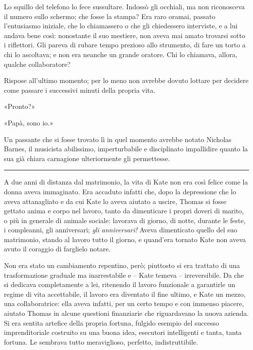 Lo squillo del telefono lo fece sussultare. Indossò gli occhiali, ma non riconosceva il numero sullo
schermo; che fosse la stampa? Era raro oramai, passato l'entusiasmo iniziale, che lo chiamassero o
che gli chiedessero interviste, e a lui andava bene così: nonostante il suo mestiere, non aveva mai
amato trovarsi sotto i riflettori. Gli pareva di rubare tempo prezioso allo strumento, di fare un
torto a chi lo ascoltava; e non era neanche un grande oratore. Chi lo chiamava, allora, qualche
collaboratore?

Rispose all'ultimo momento; per lo meno non avrebbe dovuto lottare per decidere come passare i
successivi minuti della propria vita.

«Pronto?»

«Papà, sono io.»

Un passante che si fosse trovato lì in quel momento avrebbe notato Nicholas Barnes, il musicista
abilissimo, imperturbabile e disciplinato impallidire quanto la sua già chiara carnagione
ulteriormente gli permettesse.

\plainbreak{1}

A due anni di distanza dal matrimonio, la vita di Kate non era così felice come la donna aveva
immaginato. Era accaduto infatti che, dopo la depressione che lo aveva attanagliato e da cui Kate lo
aveva aiutato a uscire, Thomas si fosse gettato anima e corpo nel lavoro, tanto da dimenticare i
propri doveri di marito, o più in generale di animale sociale: lavorava di giorno, di notte, durante
le feste, i compleanni, gli anniversari; \emph{gli anniversari!} Aveva dimenticato quello del suo
matrimonio, stando al lavoro tutto il giorno, e quand'era tornato Kate non aveva avuto il coraggio
di farglielo notare.

Non era stato un cambiamento repentino, però; piuttosto si era trattato di una trasformazione
graduale ma inarrestabile e -- Kate temeva -- irreversibile. Da che si dedicava completamente a lei,
ritenendo il lavoro funzionale a garantirle un regime di vita accettabile, il lavoro era diventato
il fine ultimo, e Kate un mezzo, una collaboratrice: ella aveva infatti, per un certo tempo e con
immenso piacere, aiutato Thomas in alcune questioni finanziarie che riguardavano la nuova azienda.
Si era sentita artefice della propria fortuna, fulgido esempio del successo imprenditoriale
costruito su una buona idea, esecutori intelligenti e tanta, tanta fortuna. Le sembrava tutto
meraviglioso, perfetto, indistruttibile.

